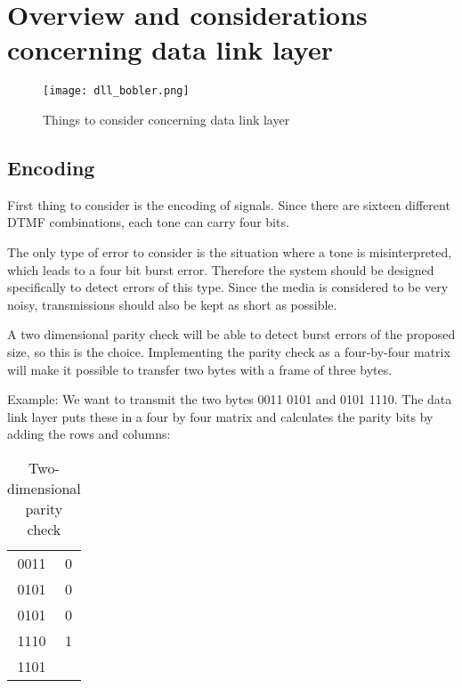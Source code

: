 \section{Overview and considerations concerning data link layer}

\begin{figure}[htb]
	\begin{center}
	\texttt{[image: dll\_bobler.png]}
	\caption{Things to consider concerning data link layer}
	\label{fig:dll_bobler}
	\end{center}
\end{figure}

\subsection{Encoding}
First thing to consider is the encoding of signals. Since there are sixteen
different DTMF combinations, each tone can carry four bits.

The only type of error to consider is the situation where a tone is
misinterpreted, which leads to a four bit burst error. Therefore the system
should be designed specifically to detect errors of this type. Since the media
is considered to be very noisy, transmissions should also be kept as short as
possible.

A two dimensional parity check will be able to detect burst errors of the
proposed size, so this is the choice. Implementing the parity check as a
four-by-four matrix will make it possible to transfer two bytes with a frame of
three bytes.

Example: We want to transmit the two bytes 0011 0101 and 0101 1110. The data
link layer puts these in a four by four matrix and calculates the parity bits by
adding the rows and columns:

\begin{table}[htb]
	\begin{center}
	\begin{tabular}{c|c}
	0011 & 0 \\
	0101 & 0 \\
	0101 & 0 \\
	1110 & 1 \\
	\hline
	1101 & \\
	\end{tabular}
	\end{center}
	\caption{Two-dimensional parity check}
	\label{tab:two_dimensional_parity_check}
\end{table}

